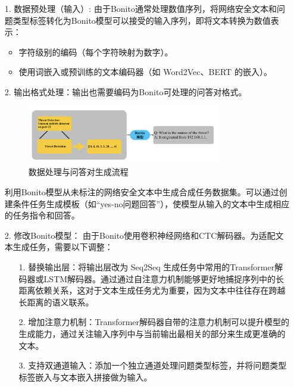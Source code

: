 \begin{itemize}
    \item[1.] 数据预处理（输入）:
    由于Bonito通常处理数值序列，将网络安全文本和问题类型标签转化为Bonito模型可以接受的输入序列，即将文本转换为数值表示：
        \begin{itemize}
            \item 字符级别的编码（每个字符映射为数字）。
            \item 使用词嵌入或预训练的文本编码器（如 Word2Vec、BERT 的嵌入）。
        \end{itemize}
        \item[2.]输出格式处理：输出也需要编码为Bonito可处理的问答对格式。
        \begin{figure}[htbp]
            \centering
            \includegraphics[width=0.8\textwidth]{./img/datadeal2.png}
            \caption{数据处理与问答对生成流程}\label{fig:bonito}
        \end{figure}
    利用Bonito模型从未标注的网络安全文本中生成合成任务数据集。可以通过创建条件任务生成模板（如“yes-no问题回答”），使模型从输入的文本中生成相应的任务指令和回答\cite{nayak-etal-2024-learning}​。
    \item[2.]修改Bonito模型：
    由于Bonito使用卷积神经网络和CTC解码器。为适配文本生成任务，需要以下调整：
    \begin{itemize}
        \item[1.]替换输出层：将输出层改为 Seq2Seq 生成任务中常用的Transformer解码器或LSTM解码器。通过通过自注意力机制能够更好地捕捉序列中的长距离依赖关系，这对于文本生成任务尤为重要，因为文本中往往存在跨越长距离的语义联系。
        \item[2.]增加注意力机制：Transformer解码器自带的注意力机制可以提升模型的生成能力，通过关注输入序列中与当前输出最相关的部分来生成更准确的文本。
        \item[3.]支持双通道输入：添加一个独立通道处理问题类型标签，并将问题类型标签嵌入与文本嵌入拼接做为输入。
    \end{itemize}
\end{itemize}
